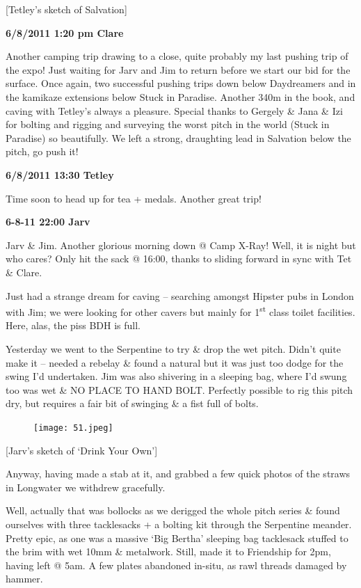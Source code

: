 {[}Tetley's sketch of Salvation{]}

\textbf{6/8/2011 1:20 pm Clare}

Another camping trip drawing to a close, quite probably my last pushing
trip of the expo! Just waiting for Jarv and Jim to return before we
start our bid for the surface. Once again, two successful pushing trips
down below Daydreamers and in the kamikaze extensions below Stuck in
Paradise. Another 340m in the book, and caving with Tetley's always a
pleasure. Special thanks to Gergely \& Jana \& Izi for bolting and
rigging and surveying the worst pitch in the world (Stuck in Paradise)
so beautifully. We left a strong, draughting lead in Salvation below the
pitch, go push it!

\textbf{6/8/2011 13:30 Tetley}

Time soon to head up for tea + medals. Another great trip!

\textbf{6-8-11 22:00 Jarv}

Jarv \& Jim. Another glorious morning down @ Camp X-Ray! Well, it is
night but who cares? Only hit the sack @ 16:00, thanks to sliding
forward in sync with Tet \& Clare.

Just had a strange dream for caving -- searching amongst Hipster pubs in
London with Jim; we were looking for other cavers but mainly for
1\textsuperscript{st} class toilet facilities. Here, alas, the piss BDH
is full.

Yesterday we went to the Serpentine to try \& drop the wet pitch. Didn't
quite make it -- needed a rebelay \& found a natural but it was just too
dodge for the swing I'd undertaken. Jim was also shivering in a sleeping
bag, where I'd swung too was wet \& NO PLACE TO HAND BOLT. Perfectly
possible to rig this pitch dry, but requires a fair bit of swinging \& a
fist full of bolts.

\begin{figure}[htbp]
\centering
\texttt{[image: 51.jpeg]}
\caption{}
\end{figure}

{[}Jarv's sketch of `Drink Your Own'{]}

Anyway, having made a stab at it, and grabbed a few quick photos of the
straws in Longwater we withdrew gracefully.

Well, actually that was bollocks as we derigged the whole pitch series
\& found ourselves with three tacklesacks + a bolting kit through the
Serpentine meander. Pretty epic, as one was a massive `Big Bertha'
sleeping bag tacklesack stuffed to the brim with wet 10mm \& metalwork.
Still, made it to Friendship for 2pm, having left @ 5am. A few plates
abandoned in-situ, as rawl threads damaged by hammer.

